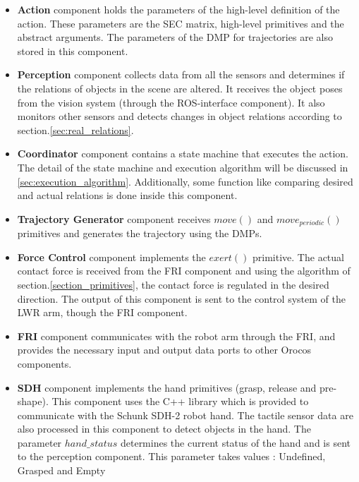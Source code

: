 \begin{itemize}
 \item{\textbf{Action}}
component holds the parameters of the high-level definition of the action.
These parameters are the SEC matrix, high-level primitives and the abstract arguments.
The parameters of the DMP for trajectories are also stored in this component.
\item{\textbf{Perception}}
component collects data from all the sensors and determines if the relations of objects in the scene are altered.
It receives the object poses from the vision system (through the ROS-interface component).
It also monitors other sensors and detects changes in object relations according to section.\ref{sec:real_relations}.
\item{\textbf{Coordinator}}
component contains a state machine that executes the action.
The detail of the state machine and execution algorithm will be discussed in \ref{sec:execution_algorithm}.
Additionally, some function like comparing desired and actual relations is done inside this component.

\item{\textbf{Trajectory Generator}}
component receives $move()$ and $move_{periodic}()$ primitives and generates the trajectory using the DMPs.

\item{\textbf{Force Control}}
component implements the $exert()$ primitive.
The actual contact force is received from the FRI component and using the algorithm of section.\ref{section_primitives},
the contact force is regulated in the desired direction.
The output of this component is sent to the control system of the LWR arm, though the FRI component.

\item{\textbf{FRI}}
component communicates with the robot arm through the FRI,
and provides the necessary input and output data ports to other Orocos components.

\item{\textbf{SDH}}
component implements the hand primitives (grasp, release and pre-shape).
This component uses the C++ library which is provided to communicate with the Schunk SDH-2 robot hand.
The tactile sensor data are also processed in this component to detect objects in the hand.
The parameter $hand\_status$ determines the current status of the hand and is sent to the perception component.
This parameter takes values : Undefined, Grasped and Empty


\end{itemize}
